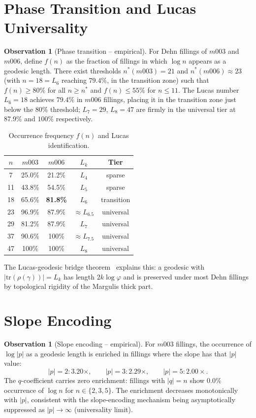 \documentclass[12pt]{article}
\theoremstyle{definition}
\newtheorem{observation}[theorem]{Observation}
\newcommand{\ph}{\varphi}
\begin{document}
\section{Phase Transition and Lucas Universality}

\begin{observation}[Phase transition -- empirical]
For Dehn fillings of $m003$ and $m006$, define $f(n)$ as the fraction
of fillings in which $\log n$ appears as a geodesic length.
There exist thresholds $n^*(m003) = 21$ and $n^*(m006) \approx 23$
(with $n=18=L_6$ reaching $79.4\%$, in the transition zone) such that
$f(n) \ge 80\%$ for all $n \ge n^*$ and $f(n) \le 55\%$ for $n \le 11$.
The Lucas number $L_6 = 18$ achieves $79.4\%$ in $m006$ fillings,
placing it in the transition zone just below the $80\%$ threshold;
$L_7=29$, $L_8=47$ are firmly in the universal tier at $87.9\%$
and $100\%$ respectively.
\end{observation}

\begin{table}[htbp]
\centering
\caption{Occurrence frequency $f(n)$ and Lucas identification.}
\label{tab:main}
\begin{tabular}{ccccc}
\toprule
$n$ & $m003$ & $m006$ & $L_k$ & Tier \\
\midrule
 7 & 25.0\% & 21.2\% & $L_4$ & sparse \\
11 & 43.8\% & 54.5\% & $L_5$ & sparse \\
18 & 65.6\% & \textbf{81.8\%} & $L_6$ & transition \\
23 & 96.9\% & 87.9\% & $\approx L_{6.5}$ & universal \\
29 & 81.2\% & 87.9\% & $L_7$ & universal \\
37 & 90.6\% & 100\% & $\approx L_{7.5}$ & universal \\
47 & 100\% & 100\% & $L_8$ & universal \\
\bottomrule
\end{tabular}
\end{table}

The Lucas-geodesic bridge theorem~\cite{Gentry:Lucas} explains this:
a geodesic with $|\mathrm{tr}(\rho(\gamma))| = L_k$ has length
$2k\log\ph$ and is preserved under most Dehn fillings by topological
rigidity of the Margulis thick part.

\section{Slope Encoding}

\begin{observation}[Slope encoding -- empirical]
For $m003$ fillings, the occurrence of $\log|p|$ as a geodesic length
is enriched in fillings where the slope has that $|p|$ value:
\[
|p|=2: 3.20\times,\qquad |p|=3: 2.29\times,\qquad |p|=5: 2.00\times.
\]
The $q$-coefficient carries zero enrichment: fillings with $|q|=n$
show $0.0\%$ occurrence of $\log n$ for $n\in\{2,3,5\}$.
The enrichment decreases monotonically with $|p|$, consistent with
the slope-encoding mechanism being asymptotically suppressed as
$|p|\to\infty$ (universality limit).
\end{observation}
\end{document}
